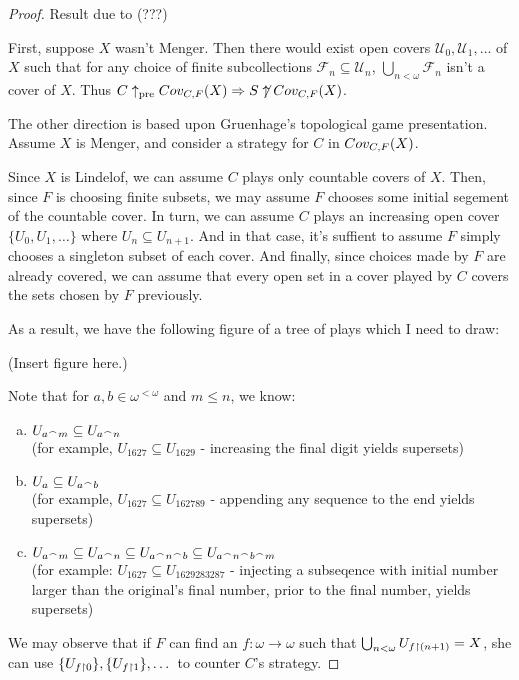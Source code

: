   \begin{proof}
    Result due to (???)

    First, suppose $X$ wasn't Menger. Then there would exist open covers $\mathcal{U}_0,\mathcal{U}_1,\dots$ of $X$ such that for any choice of finite subcollections $\mathcal{F}_n\subseteq\mathcal{U}_n$, $\bigcup_{n<\omega} \mathcal{F}_n$ isn't a cover of $X$. Thus $C\uparrow_{\text{pre}}Cov_{C,F}(X) \Rightarrow S \not\uparrow Cov_{C,F}(X)$.

    The other direction is based upon Gruenhage's topological game presentation. Assume $X$ is Menger, and consider a strategy for $C$ in $Cov_{C,F}(X)$.

    Since $X$ is Lindelof, we can assume $C$ plays only countable covers of $X$. Then, since $F$ is choosing finite subsets, we may assume $F$ chooses some initial segement of the countable cover. In turn, we can assume $C$ plays an increasing open cover $\{U_0,U_1,\dots\}$ where $U_n\subseteq U_{n+1}$. And in that case, it's suffient to assume $F$ simply chooses a singleton subset of each cover. And finally, since choices made by $F$ are already covered, we can assume that every open set in a cover played by $C$ covers the sets chosen by $F$ previously.

    As a result, we have the following figure of a tree of plays which I need to draw:

    (Insert figure here.)

    Note that for $a,b\in\omega^{<\omega}$ and $m\leq n$, we know:
      \begin{enumerate}[(a)]
        \item $U_{a^\frown m}\subseteq U_{a^\frown n}$ \\ (for example, $U_{1627} \subseteq U_{1629}$ - increasing the final digit yields supersets)
        \item $U_a \subseteq U_{a^\frown b}$ \\ (for example, $U_{1627}\subseteq U_{162789}$ - appending any sequence to the end yields supersets)
        \item $U_{a^\frown m} \subseteq U_{a^\frown n} \subseteq U_{a^\frown n^\frown b} \subseteq U_{a^\frown n^\frown b^\frown m}$ \\ (for example: $U_{1627} \subseteq U_{1629283287}$ - injecting a subseqence with initial number larger than the original's final number, prior to the final number, yields supersets) 
      \end{enumerate}

    We may observe that if $F$ can find an $f:\omega\to\omega$ such that $\bigcup_{n<\omega}U_{f\restriction (n+1)} = X$, she can use $\{U_{f\restriction 0}\}, \{U_{f\restriction 1}\}, \dots$ to counter $C$'s strategy.


\end{proof}
